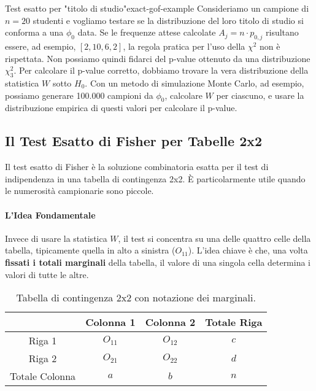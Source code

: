 \begin{esempio}{Test esatto per "titolo di studio"}{exact-gof-example}
Consideriamo un campione di \(n=20\) studenti e vogliamo testare se la
distribuzione del loro titolo di studio si conforma a una \(\phi_0\) data. Se le
frequenze attese calcolate \(A_j = n \cdot p_{0,j}\) risultano essere, ad
esempio, \([2, 10, 6, 2]\), la regola pratica per l'uso della \(\chi^2\) non è
rispettata. Non possiamo quindi fidarci del p-value ottenuto da una
distribuzione \(\chi^2_3\). Per calcolare il p-value corretto, dobbiamo trovare
la vera distribuzione della statistica \(W\) sotto \(H_0\). Con un metodo di
simulazione Monte Carlo, ad esempio, possiamo generare 100.000 campioni da
\(\phi_0\), calcolare \(W\) per ciascuno, e usare la distribuzione empirica di
questi valori per calcolare il p-value.
\end{esempio}

\subsection{Il Test Esatto di Fisher per Tabelle 2x2}
Il test esatto di Fisher è la soluzione combinatoria esatta per il test di
indipendenza in una tabella di contingenza 2x2. È particolarmente utile quando
le numerosità campionarie sono piccole.

\paragraph{L'Idea Fondamentale}
Invece di usare la statistica \(W\), il test si concentra su una delle quattro
celle della tabella, tipicamente quella in alto a sinistra (\(O_{11}\)). L'idea
chiave è che, una volta \textbf{fissati i totali marginali} della tabella, il
valore di una singola cella determina i valori di tutte le altre.

\begin{table}[ht]
    \centering
    \caption{Tabella di contingenza 2x2 con notazione dei marginali.}
    \begin{tabular}{c|cc|c}
        & Colonna 1 & Colonna 2 & Totale Riga \\
        \hline
        Riga 1 & \(O_{11}\) & \(O_{12}\) & \(c\) \\
        Riga 2 & \(O_{21}\) & \(O_{22}\) & \(d\) \\
        \hline
        Totale Colonna & \(a\) & \(b\) & \(n\) \\
    \end{tabular}
\end{table}

